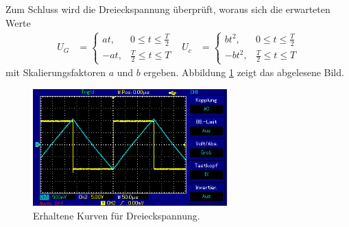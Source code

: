 Zum Schluss wird die Dreieckspannung überprüft, woraus sich die erwarteten Werte
\begin{align}
  U_G &=
  \begin{cases}
    at , &  0 \leq t \leq \frac{T}{2} \\
    -at , & \frac{T}{2} \leq t \leq T
  \end{cases}
  & U_c &=
  \begin{cases}
    b t^2 , &  0 \leq t \leq \frac{T}{2} \\
    -b t^2 , & \frac{T}{2} \leq t \leq T
  \end{cases}
\end{align}
mit Skalierungsfaktoren $a$ und $b$ ergeben.
Abbildung \ref{fig:s_s} zeigt das abgelesene Bild.

\begin{figure}[H]
  \centering
  \includegraphics[height=4.5cm]{oz7.png}
  \caption{Erhaltene Kurven für Dreieckspannung.}
  \label{fig:s_s}
\end{figure}
